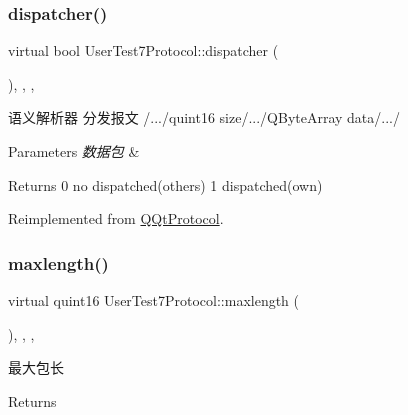 \subsubsection{\texorpdfstring{dispatcher()}{dispatcher()}}
{\footnotesize\ttfamily virtual bool User\+Test7\+Protocol\+::dispatcher (\begin{DoxyParamCaption}\item[{const Q\+Byte\+Array \&}]{ }\end{DoxyParamCaption})\hspace{0.3cm}{\ttfamily [inline]}, {\ttfamily [override]}, {\ttfamily [protected]}, {\ttfamily [virtual]}}



语义解析器 分发报文 /.../quint16 size/.../\+Q\+Byte\+Array data/.../ 


\begin{DoxyParams}{Parameters}
{\em 数据包} & \\
\hline
\end{DoxyParams}
\begin{DoxyReturn}{Returns}
0 no dispatched(others) 1 dispatched(own) 
\end{DoxyReturn}


Reimplemented from \mbox{\hyperlink{class_q_qt_protocol_a35a69c4b89c8cf7459038f40d75e0dc9}{Q\+Qt\+Protocol}}.

\mbox{\label{class_user_test7_protocol_a67a1a31d8896e45be9cbfa83b1282656}} 
\subsubsection{\texorpdfstring{maxlength()}{maxlength()}}
{\footnotesize\ttfamily virtual quint16 User\+Test7\+Protocol\+::maxlength (\begin{DoxyParamCaption}{ }\end{DoxyParamCaption})\hspace{0.3cm}{\ttfamily [inline]}, {\ttfamily [override]}, {\ttfamily [protected]}, {\ttfamily [virtual]}}



最大包长 

\begin{DoxyReturn}{Returns}

\end{DoxyReturn}


